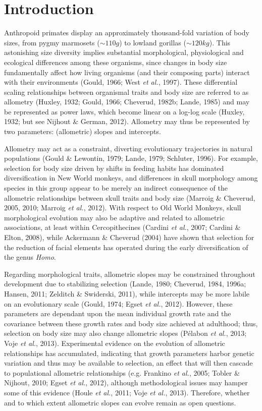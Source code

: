 \documentclass[12pt,twoside]{report}
\begin{document}
\section{Introduction}\label{introduction-1}

Anthropoid primates display an approximately thousand-fold variation of
body sizes, from pygmy marmosets ($\sim 110g$) to lowland gorillas
($\sim 120kg$). This astonishing size diversity implies substantial
morphological, physiological and ecological differences among these
organisms, since changes in body size fundamentally affect how living
organisms (and their composing parts) interact with their environments
(Gould, 1966; West \emph{et al.}, 1997). These differential scaling
relationships between organismal traits and body size are referred to as
allometry (Huxley, 1932; Gould, 1966; Cheverud, 1982b; Lande, 1985) and
may be represented as power laws, which become linear on a log-log scale
(Huxley, 1932; but see Nijhout \& German, 2012). Allometry may thus be
represented by two parameters: (allometric) slopes and intercepts.

Allometry may act as a constraint, diverting evolutionary trajectories
in natural populations (Gould \& Lewontin, 1979; Lande, 1979; Schluter,
1996). For example, selection for body size driven by shifts in feeding
habits has dominated diversification in New World monkeys, and
differences in skull morphology among species in this group appear to be
merely an indirect consequence of the allometric relationships between
skull traits and body size (Marroig \& Cheverud, 2005, 2010; Marroig
\emph{et al.}, 2012). With respect to Old World Monkeys, skull
morphological evolution may also be adaptive and related to allometric
associations, at least within Cercopithecines (Cardini \emph{et al.},
2007; Cardini \& Elton, 2008), while Ackermann \& Cheverud (2004) have
shown that selection for the reduction of facial elements has operated
during the early diversification of the genus \emph{Homo}.

Regarding morphological traits, allometric slopes may be constrained
throughout development due to stabilizing selection (Lande, 1980;
Cheverud, 1984, 1996a; Hansen, 2011; Zelditch \& Swiderski, 2011), while
intercepts may be more labile on an evolutionary scale (Gould, 1974;
Egset \emph{et al.}, 2012). However, these parameters are dependant upon
the mean individual growth rate and the covariance between these growth
rates and body size achieved at adulthood; thus, selection on body size
may also change allometric slopes (Pélabon \emph{et al.}, 2013; Voje
\emph{et al.}, 2013). Experimental evidence on the evolution of
allometric relationships has accumulated, indicating that growth
parameters harbor genetic variation and thus may be available to
selection, an effect that will then cascade to populational allometric
relationships (e.g. Frankino \emph{et al.}, 2005; Tobler \& Nijhout,
2010; Egset \emph{et al.}, 2012), although methodological issues may
hamper some of this evidence (Houle \emph{et al.}, 2011; Voje \emph{et
al.}, 2013). Therefore, whether and to which extent allometric slopes
can evolve remain as open questions.
\end{document}
